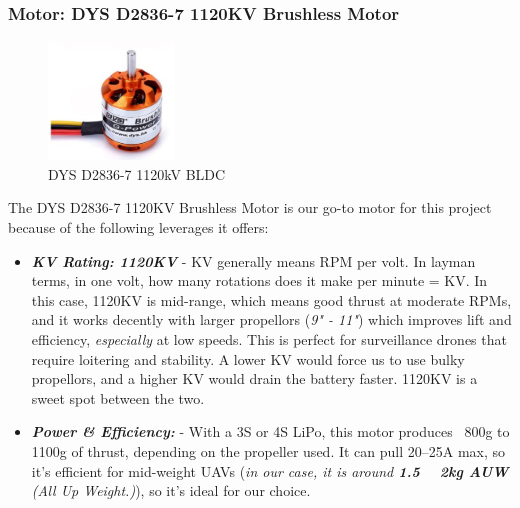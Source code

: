 \documentclass[12pt]{report}
\begin{document}
      \subsubsection{Motor: DYS D2836-7 1120KV Brushless Motor} 
      \begin{figure}
        \includegraphics[width=0.3\textwidth]{bldc.png}
        \caption{DYS D2836-7 1120kV BLDC}
        \label{fig:bldc1120}
      \end{figure}
      The DYS D2836-7 1120KV Brushless Motor is our go-to motor for this project because of the following leverages it offers:
        
      \begin{itemize}
        \item \textbf{\textit{KV Rating: 1120KV}} - KV generally means RPM per volt. In layman terms, in one volt, how many rotations does it make per minute = KV. In this case, 1120KV is mid-range, which means good thrust at moderate RPMs, and it works decently with larger propellors (\textit{9" - 11"}) which improves lift and efficiency, \textit{especially} at low speeds. This is perfect for surveillance drones that require loitering and stability. A lower KV would force us to use bulky propellors, and a higher KV would drain the battery faster. 1120KV is a sweet spot between the two.
        \item \textbf{\textit{Power \& Efficiency:}} - With a 3S or 4S LiPo, this motor produces ~800g to 1100g of thrust, depending on the propeller used. It can pull 20–25A max, so it's efficient for mid-weight UAVs (\textit{in our case, it is around \textbf{1.5 ~ 2kg AUW} (All Up Weight.)}), so it's ideal for our choice.
      \end{itemize}
      
\end{document}
